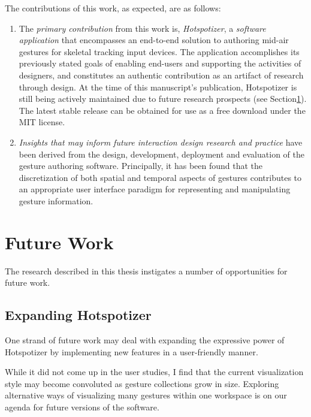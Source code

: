 The contributions of this work, as expected, are as follows:

\begin{enumerate}
\item The \emph{primary contribution} from this work is, \emph{Hotspotizer}, a \emph{software application} that encompasses an end-to-end solution to authoring mid-air gestures for skeletal tracking input devices. The application accomplishes its previously stated goals of enabling end-users and supporting the activities of designers, and constitutes an authentic contribution as an artifact of research through design. At the time of this manuscript's publication, Hotspotizer is still being actively maintained due to future research prospects (see Section\ref{sec:future-work}). The latest stable release can be obtained for use as a free download under the MIT license.
\item \emph{Insights that may inform future interaction design research and practice} have been derived from the design, development, deployment and evaluation of the gesture authoring software. Principally, it has been found that the discretization of both spatial and temporal aspects of gestures contributes to an appropriate user interface paradigm for representing and manipulating gesture information.
\end{enumerate}

\section{Future Work}
\label{sec:future-work}

The research described in this thesis instigates a number of opportunities for future work.

\subsection{Expanding Hotspotizer}

One strand of future work may deal with expanding the expressive power of Hotspotizer by implementing new features in a user-friendly manner.

While it did not come up in the user studies, I find that the current visualization style may become convoluted as gesture collections grow in size. Exploring alternative ways of visualizing many gestures within one workspace is on our agenda for future versions of the software.

